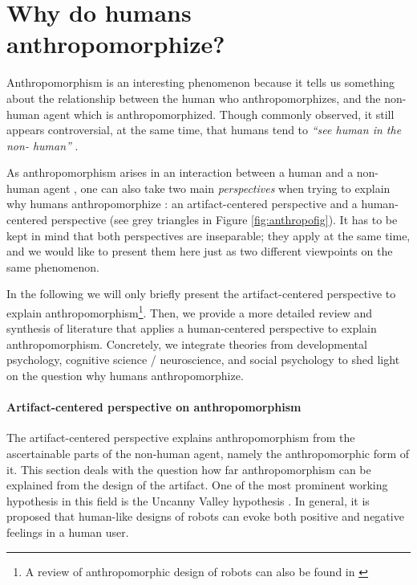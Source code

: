 \documentclass{frontiersSCNS} %
\begin{document}
%
%
%
%
%
%


\section{Why do humans anthropomorphize?}
\label{sec:anthropomorphism}

Anthropomorphism is an interesting phenomenon because it tells us something about 
the relationship between the human who anthropomorphizes, and the non-human agent 
which is anthropomorphized. Though commonly observed, it still appears controversial, at 
the same time, that humans tend to \textit{``see human in the non-
human''} \citep{epley_seeing_2007}.

As anthropomorphism arises in an interaction between a human and a non-human agent
\citep{persson_anthropomorphism_2000}, one can also
take two main \textit{perspectives} when trying to explain why humans anthropomorphize \citep{lee_human_2005}: an artifact-centered perspective and a human-centered perspective (see grey triangles in Figure \ref{fig:anthropofig}). It has to be kept in mind that both perspectives are inseparable; they apply at the 
same time, and we would like to present them here just as two different viewpoints 
on the same phenomenon.

In the following we will only briefly present the artifact-centered perspective to explain anthropomorphism\footnote{A review of anthropomorphic design of robots can also be found in \cite{fink_anthropomorphism_2012}}. Then, we provide a more detailed review and synthesis of literature that applies a human-centered perspective to explain anthropomorphism. Concretely, we integrate theories from developmental psychology, cognitive science / neuroscience, and social psychology to shed light on the question why humans anthropomorphize.


\paragraph{Artifact-centered perspective on anthropomorphism\\}

The artifact-centered perspective explains anthropomorphism from the
ascertainable parts of the non-human agent, namely the anthropomorphic form of
it. This section deals with the question how far anthropomorphism can be
explained from the design of the artifact.  One of the most prominent working
hypothesis in this field is the Uncanny Valley hypothesis
\citep{mori_uncanny_1970}. In general, it is proposed that human-like designs of
robots can evoke both positive and negative feelings in a human user. 
\end{document}
